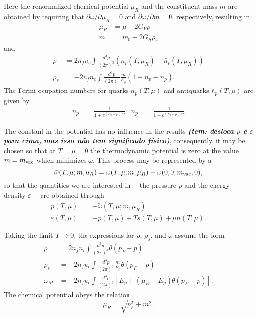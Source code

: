\documentclass[prc, reprint, amsmath, linenumbers,10pt]{revtex4-1}
\newcommand{\comment}[1]{{\bf\textit{#1}}}
\begin{document}
Here the renormalized chemical potential $\mu_R$ and the constituent mass $m$ are obtained by requiring that $\partial \omega / \partial \mu_R = 0$ and $\partial \omega / \partial m = 0$, respectively, resulting in
\begin{align}
	\mu_R &= \mu - 2 G_V \rho \\
	m &= m_0 - 2 G_S \rho_s
\end{align}
%
and
\begin{align}
	\rho &= 2 n_f n_c \int \frac{d^3p}{(2\pi)^3} (n_p(T, \mu_R) - \bar{n}_p(T, \mu_R))\\
	\rho_s &= - 2 n_f n_c \int\frac{d^3p}{(2\pi)^3} \frac{m}{E_p}(1 - n_p -\bar{n}_p).
\end{align}
%
The Fermi ocupation numbers for quarks $n_p(T, \mu)$ and antiquarks $\bar{n}_p(T, \mu)$ are given by
\begin{align}
	n_p &= \frac{1}{1 + e^{(E_p - \mu)/T}} & \bar{n}_p &= \frac{1}{1 + e^{(E_p + \mu)/T}}
\end{align}

The constant in the potential has no influence in the results \comment{(tem: desloca $p$ e $\varepsilon$ para cima, mas isso não tem significado físico)}, consequently, it may be chosen so that at $T = \mu = 0$ the thermodynamic potential is zero at the value $m = m_{\rm{vac}}$ which minimizes $\omega$. This process may be represented by a  
\begin{equation}
	\tilde\omega(T, \mu; m, \mu_R) = \omega(T, \mu; m, \mu_R) - \omega(0, 0; m_{\rm{vac}}, 0),
\end{equation}
%
so that the quantities we are interested in --~the pressure $p$ and the energy density $\varepsilon$~-- are obtained through
\begin{align}
		p(T, \mu) &= -\tilde\omega(T, \mu; m, \mu_R) \label{Exp_pressao_T}\\
		\varepsilon(T, \mu) &= -p(T, \mu) + T s(T, \mu) + \mu n(T,\mu). \label{Exp_energia_T}
\end{align}
	
Taking the limit $T \to 0$, the expressions for $\rho$, $\rho_s$, and $\tilde\omega$ assume the form
\begin{align}
	\rho &=  2 n_f n_c \int \frac{d^3p}{(2\pi)^3} \theta(p_F - p)\\
	\rho_s &= - 2 n_f n_c \int\frac{d^3p}{(2\pi)^3} \frac{m}{E_p} \theta(p_F - p)\\
	\omega_M &= -2 n_f n_c \int\frac{d^3p}{(2\pi)^3} [E_p + (\mu_R - E_p)\theta(p_F - p)].
\end{align}
%
The chemical potential obeys the relation
\begin{equation}
	\mu_R = \sqrt{p_F^2 + m^2}.
\end{equation}
\end{document}
